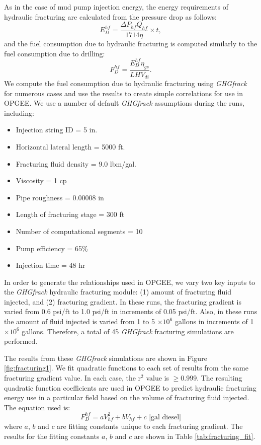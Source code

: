 \documentclass[11pt]{report}
\begin{document}
As in the case of mud pump injection energy, the energy requirements of hydraulic fracturing are calculated from the pressure drop as follows:
\begin{equation}
E_{D}^{hf} = \frac{\Delta P_{hf} Q_{hf}}{1714 \eta} \times t,
\end{equation}
and the fuel consumption due to hydraulic fracturing is computed similarly to the fuel consumption due to drilling:
\begin{equation}
F_{D}^{hf} = \frac{E_{D}^{hf} \eta_{gs}}{LHV_{di}}.
\end{equation}
We compute the fuel consumption due to hydraulic fracturing using \emph{GHGfrack} for numerous cases and use the results to create simple correlations for use in OPGEE.  We use a number of default \emph{GHGfrack} assumptions during the runs, including:
\begin{itemize}
\item Injection string ID = 5 in.
\item Horizontal lateral length = 5000 ft.
\item Fracturing fluid density = 9.0 lbm/gal.
\item Viscosity = 1 cp
\item Pipe roughness = 0.00008 in
\item Length of fracturing stage = 300 ft
\item Number of computational segments = 10
\item Pump efficiency = 65\%
\item Injection time = 48 hr
\end{itemize}
In order to generate the relationships used in OPGEE, we vary two key inputs to the \emph{GHGfrack} hydraulic fracturing module: (1) amount of fracturing fluid injected, and (2) fracturing gradient.  In these runs, the fracturing gradient is varied from 0.6 psi/ft to 1.0 psi/ft in increments of 0.05 psi/ft.  Also, in these runs the amount of fluid injected is varied from 1 to 5 $\times 10^6$ gallons in increments of 1$\times 10^6$ gallons.  Therefore, a total of 45 \emph{GHGfrack} fracturing simulations are performed.

The results from these \emph{GHGfrack} simulations are shown in Figure \ref{fig:fracturing1}.  We fit quadratic functions to each set of results from the same fracturing gradient value.  In each case, the r$^2$ value is $\geq$0.999.  The resulting quadratic function coefficients are used in OPGEE to predict hydraulic fracturing energy use in a particular field based on the volume of fracturing fluid injected.  The equation used is:
\begin{equation}
F_{D}^{hf}=  a V_{hf}^2 + b V_{hf} + c \text{ [gal diesel]}
\end{equation}
where $a$, $b$ and $c$ are fitting constants unique to each fracturing gradient.  The results for the fitting constants $a$, $b$ and $c$ are shown in Table \ref{tab:fracturing_fit}.
\end{document}
